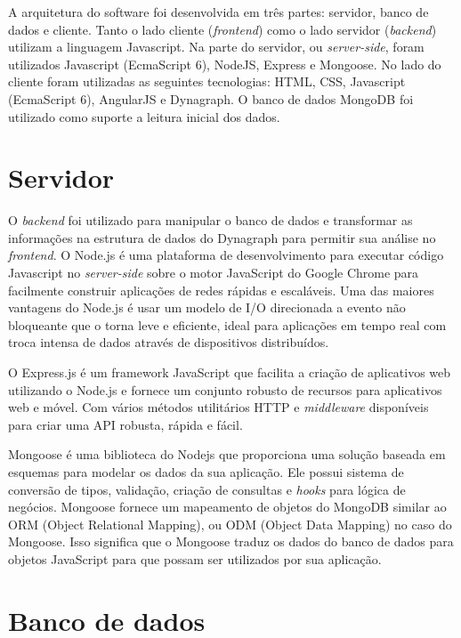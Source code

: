 \label{ap:tecnologias}

A arquitetura do software foi desenvolvida em três partes: servidor, banco de dados e cliente. Tanto o lado cliente (\textit{frontend}) como o lado servidor (\textit{backend})
utilizam a linguagem Javascript.
Na parte do servidor, ou \textit{server-side}, foram utilizados Javascript (EcmaScript 6), NodeJS, Express e Mongoose. No lado do cliente foram utilizadas as seguintes tecnologias:
HTML, CSS, Javascript (EcmaScript 6), AngularJS e Dynagraph. O banco de dados MongoDB foi utilizado como suporte a leitura inicial dos dados.


\section{Servidor}
O \textit{backend} foi utilizado para manipular o banco de dados e transformar as informações na estrutura de dados do Dynagraph para permitir sua análise no \textit{frontend}.
O Node.js é uma plataforma de desenvolvimento para executar código Javascript no \textit{server-side} sobre o motor JavaScript do Google Chrome para facilmente construir aplicações de redes rápidas e escaláveis. Uma das maiores vantagens do Node.js é usar um modelo de I/O direcionada a evento não bloqueante que o torna leve e eficiente, ideal para aplicações em tempo real com troca intensa de dados através de dispositivos distribuídos.

O Express.js é um framework JavaScript que facilita a criação de aplicativos web utilizando o Node.js e fornece um conjunto robusto de recursos para aplicativos web e móvel. Com vários métodos utilitários HTTP e \textit{middleware} disponíveis para criar uma API robusta, rápida e fácil. 

Mongoose é uma biblioteca do Nodejs que proporciona uma solução baseada em esquemas para modelar os dados da sua aplicação. Ele possui sistema de conversão de tipos, validação, criação de consultas e \textit{hooks} para lógica de negócios. Mongoose fornece um mapeamento de objetos do MongoDB similar ao ORM (Object Relational Mapping), ou ODM (Object Data Mapping) no caso do Mongoose. Isso significa que o Mongoose traduz os dados do banco de dados para objetos JavaScript para que possam ser utilizados por sua aplicação.

\section{Banco de dados}

